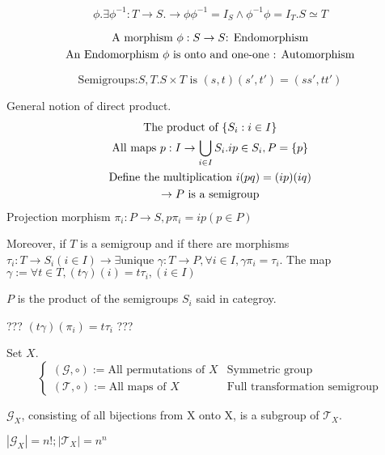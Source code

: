 \begin{Def}[Isomorphism]
    \[
        \phi. \exists \phi^{-1}: T \rightarrow S. \rightarrow
        \phi\phi^{-1}=I_S \wedge \phi^{-1}\phi=I_T. S \simeq T
    \]
\end{Def}

\begin{Def}
    \begin{gather*}
        \text{A morphism } \phi: S \rightarrow S    \text{: Endomorphism}\\
        \text{An Endomorphism } \phi \text{ is onto and one-one \text{: Automorphism}}
    \end{gather*}
\end{Def}

\begin{Def}
    \[\text{Semigroups:}S,T. S\times T \text{ is } (s,t)(s',t')=(ss',tt')\]

    General notion of direct product.
    \begin{gather*}
        \text{The product of } \{S_i:i\in I\}   \\
        \text{All maps } p: I \rightarrow \bigcup _{i \in I} S_i. ip\in S_i, P=\{p\}  \\
        \text{Define the multiplication }i(pq)=(ip)(iq) \\
        \rightarrow P \text{\space is a semigroup}
    \end{gather*}
    Projection morphism
    $\pi_i:P \rightarrow S, p\pi_i=ip(p \in P)$
    
    Moreover, if $T$ is a semigroup and if there are morphisms $\tau_i:T\rightarrow S_i(i \in I) \rightarrow \exists \text{unique } \gamma: T \rightarrow P, \forall i\in I,\gamma \pi_i=\tau_i$. The map $\gamma:= \forall t \in T, (t\gamma)(i)=t\tau_i,(i \in I)$

    $P$ is the product of the semigroups $S_i$ said in categroy.

    ??? $(t\gamma)(\pi_i)=t\tau_i$ ???
\end{Def}

\begin{Def}
    Set $X$.
    \[
    \begin{cases}
        (\mathcal{G},\circ):= \text{All permutations of }X  &  \text{Symmetric group}   \\
        (\mathcal{T},\circ):= \text{All maps of }X          &   \text{Full transformation semigroup}
    \end{cases}\]
    
    $\mathcal{G}_X$, consisting of all bijections from X onto X, is a subgroup of $\mathcal{T}_X$.

    $|\mathcal{G}_X|=n!; |\mathcal{T}_X|=n^n$
\end{Def}

